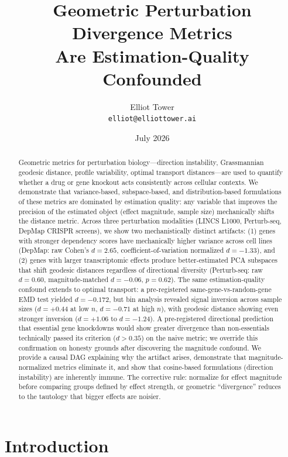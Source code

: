 \documentclass[11pt]{article}
\title{Geometric Perturbation Divergence Metrics\\Are Estimation-Quality Confounded}
\author{Elliot Tower\\
\texttt{elliot@elliottower.ai}}
\date{July 2026}
\begin{document}
\maketitle

\begin{abstract}
Geometric metrics for perturbation biology---direction instability,
Grassmannian geodesic distance, profile variability, optimal transport
distances---are used to quantify whether a drug or gene knockout acts
consistently across cellular contexts. We demonstrate that
variance-based, subspace-based, and distribution-based formulations of
these metrics are dominated by estimation quality: any variable that
improves the precision of the estimated object (effect magnitude,
sample size) mechanically shifts the distance metric. Across
three perturbation modalities (LINCS L1000, Perturb-seq, DepMap CRISPR
screens), we show two mechanistically distinct artifacts: (1) genes with
stronger dependency scores have mechanically higher variance across cell
lines (DepMap: raw Cohen's $d = 2.65$, coefficient-of-variation
normalized $d = -1.33$), and (2) genes with larger transcriptomic
effects produce better-estimated PCA subspaces that shift geodesic
distances regardless of directional diversity (Perturb-seq: raw $d =
0.60$, magnitude-matched $d = -0.06$, $p = 0.62$). The same
estimation-quality confound extends to optimal transport: a
pre-registered same-gene-vs-random-gene EMD test yielded $d = -0.172$,
but bin analysis revealed signal inversion across sample sizes ($d =
+0.44$ at low $n$, $d = -0.71$ at high $n$), with geodesic distance
showing even stronger inversion ($d = +1.06$ to $d = -1.24$). A
pre-registered directional prediction that essential gene knockdowns
would show greater divergence than non-essentials technically passed its
criterion ($d > 0.35$) on the naive metric; we override this
confirmation on honesty grounds after discovering the magnitude
confound. We provide a causal DAG explaining why the artifact arises,
demonstrate that magnitude-normalized metrics eliminate it, and show
that cosine-based formulations (direction instability) are inherently
immune. The corrective rule: normalize for effect magnitude before
comparing groups defined by effect strength, or geometric ``divergence''
reduces to the tautology that bigger effects are noisier.
\end{abstract}

\section{Introduction}
\end{document}
